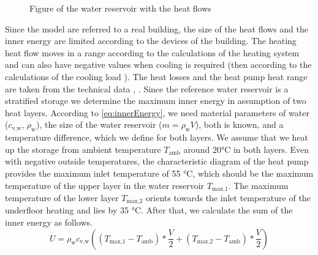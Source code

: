     \begin{figure}
        \centering
        \def\svgwidth{120pt}
        
        \caption{Figure of the water reservoir with the heat flows}
        \label{fig:Figure of the water reservoir with the heat flows}
    \end{figure}
    Since the model are referred to a real building, the size of the heat flows and the inner energy are limited according to the devices of the building. The heating heat flow moves in a range according to the calculations of the heating system \cite{Roth_Auslegung.2020} and can also have negative values when cooling is required (then according to the calculations of the cooling load \cite{SEFIngenieurgesellschaftMBH.2019}). The heat losses and the heat pump heat range are taken from the technical data \cite{Oskar}, \cite{TUM}.\newline
    Since the reference water reservoir is a stratified storage we determine the maximum inner energy in assumption of two heat layers. According to \autoref{eq:innerEnergy}, we need material parameters of water ($c_\text{v,w}$, $\rho_\text{w}$), the size of the water reservoir ($m = \rho_\text{w} V$), both is known, and a temperature difference, which we define for both layers. We assume that we heat up the storage from ambient temperature $T_\text{amb}$ around 20°C in both layers. Even with negative outside temperatures, the characteristic diagram of the heat pump provides the maximum inlet temperature of 55 °C, which should be the maximum temperature of the upper layer in the water reservoir $T_\text{max,1}$. The maximum temperature of the lower layer $T_\text{max,2}$ orients towards the inlet temperature of the underfloor heating and lies by 35 °C. After that, we calculate the sum of the inner energy as follows.
    \begin{equation}
        \label{eq:max.Energie}
        U = \rho_\text{w} c_\text{v,w} ((T_\text{max,1}-T_\text{amb})*\frac{V}{2} + (T_\text{max,2}-T_\text{amb})*\frac{V}{2}) 
    \end{equation}

